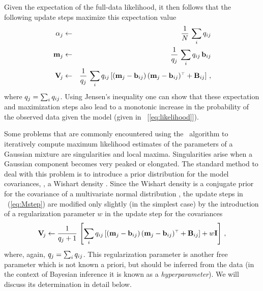 Given the expectation of the full-data likelihood, it then follows
that the following update steps maximize this expectation value
\begin{eqnarray}\label{eq:Mstep}
\alpha_j &\leftarrow& \frac{1}{N}\,\sum_i q_{ij}\nonumber \\
   \mathbf{m}_j &\leftarrow& \frac{1}{q_j}\,\sum_i q_{ij}\,\mathbf{b}_{ij}\nonumber \\
   \mathbf{V}_{\!j} &\leftarrow& \frac{1}{q_j}\,\sum_i q_{ij}
                     \left[(\mathbf{m}_j-\mathbf{b}_{ij})\,(\mathbf{m}_j-\mathbf{b}_{ij})^{\scriptscriptstyle \top} + \mathbf{B}_{ij}\right]\, ,
\end{eqnarray}
where $q_j = \sum_i q_{ij}$.  Using Jensen's inequality one can show
that these expectation and maximization steps also lead to a monotonic
increase in the probability of the observed data given the model
(given in \eqnname~[\ref{eq:likelihood}]).

Some problems that are commonly encountered using the \EM\ algorithm
to iteratively compute maximum likelihood estimates of the parameters
of a Gaussian mixture are singularities and local
maxima. Singularities arise when a Gaussian component becomes very
peaked or elongated. The standard method to deal with this problem is
to introduce a prior distribution for the model covariances, \eg, a
Wishart density \citep{Ormoneit1995}. Since the Wishart density is a
conjugate prior for the covariance of a multivariate normal
distribution \citep[\eg,][]{Gelman00a}, the update steps in
\eqnname~(\ref{eq:Mstep}) are modified only slightly (in the simplest
case) by the introduction of a regularization parameter $w$ in the
update step for the covariances
\begin{equation}\label{eq:Mstepreg}
   \mathbf{V}_{\!j} \leftarrow \frac{1}{q_j+1} \,\left[\sum_i q_{ij}
                     \left[(\mathbf{m}_j-\mathbf{b}_{ij})\,(\mathbf{m}_j-\mathbf{b}_{ij})^{\scriptscriptstyle \top}+\mathbf{B}_{ij}\right]+ w \mathbf{I}\right]\, ,
\end{equation}
where, again, $q_j = \sum_i q_{ij}$.  This regularization parameter is
another free parameter which is not known a priori, but should be
inferred from the data (in the context of Bayesian inference it is
known as a \emph{hyperparameter}). We will discuss its determination
in detail below.

